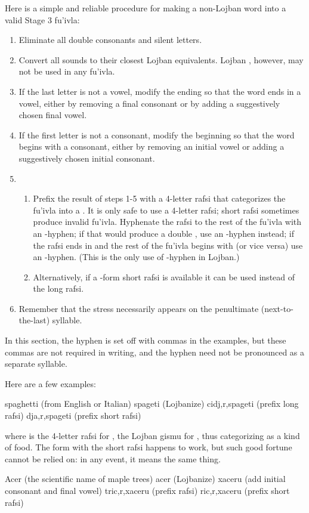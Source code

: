 Here is a simple and reliable procedure for making a non-Lojban word into a valid Stage 3 fu'ivla:
\begin{enumerate}
\item Eliminate all double consonants and silent letters.
\item Convert all sounds to their closest Lojban equivalents. Lojban , however, may not be used in any fu'ivla.
\item If the last letter is not a vowel, modify the ending so that the word ends in a vowel, either by removing a final consonant or by adding a suggestively chosen final vowel.
\item If the first letter is not a consonant, modify the beginning so that the word begins with a consonant, either by removing an initial vowel or adding a suggestively chosen initial consonant.
\item \begin{enumerate}
\item Prefix the result of steps 1-5 with a 4-letter rafsi that categorizes the fu'ivla into a . It is only safe to use a 4-letter rafsi; short rafsi sometimes produce invalid fu'ivla. Hyphenate the rafsi to the rest of the fu'ivla with an -hyphen; if that would produce a double , use an -hyphen instead; if the rafsi ends in  and the rest of the fu'ivla begins with  (or vice versa) use an -hyphen. (This is the only use of -hyphen in Lojban.)
\item Alternatively, if a -form short rafsi is available it can be used instead of the long rafsi.
\end{enumerate}

\item Remember that the stress necessarily appears on the penultimate (next-to-the-last) syllable.
\end{enumerate}

In this section, the hyphen is set off with commas in the examples, but these commas are not required in writing, and the hyphen need not be pronounced as a separate syllable. 

Here are a few examples:
\begin{example}
spaghetti (from English or Italian)\n
spageti (Lojbanize)\n
cidj,r,spageti (prefix long rafsi)\n
dja,r,spageti (prefix short rafsi)
\end{example}

{\noindent}where  is the 4-letter rafsi for , the Lojban gismu for , thus categorizing  as a kind of food. The form with the short rafsi happens to work, but such good fortune cannot be relied on: in any event, it means the same thing.
\begin{example}
Acer (the scientific name of maple trees)\n
acer (Lojbanize)\n
xaceru (add initial consonant and final vowel)\n
tric,r,xaceru (prefix rafsi)\n
ric,r,xaceru (prefix short rafsi)
\end{example}

